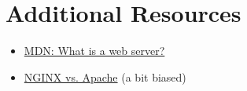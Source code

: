 \section{Additional Resources}

\begin{itemize}[leftmargin=*]
    \item \href{https://developer.mozilla.org/en-US/docs/Learn/Common_questions/What_is_a_web_server}{MDN: What is a web server?}
    \item \href{https://www.nginx.com/blog/nginx-vs-apache-our-view/}{NGINX vs. Apache} (a bit biased)
\end{itemize}